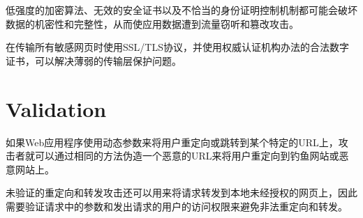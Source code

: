 低强度的加密算法、无效的安全证书以及不恰当的身份证明控制机制都可能会破坏数据的机密性和完整性，从而使应用数据遭到流量窃听和篡改攻击。

在传输所有敏感网页时使用SSL/TLS协议，并使用权威认证机构办法的合法数字证书，可以解决薄弱的传输层保护问题。

\section{Validation}

如果Web应用程序使用动态参数来将用户重定向或跳转到某个特定的URL上，攻击者就可以通过相同的方法伪造一个恶意的URL来将用户重定向到钓鱼网站或恶意网站上。

未验证的重定向和转发攻击还可以用来将请求转发到本地未经授权的网页上，因此需要验证请求中的参数和发出请求的用户的访问权限来避免非法重定向和转发。






























